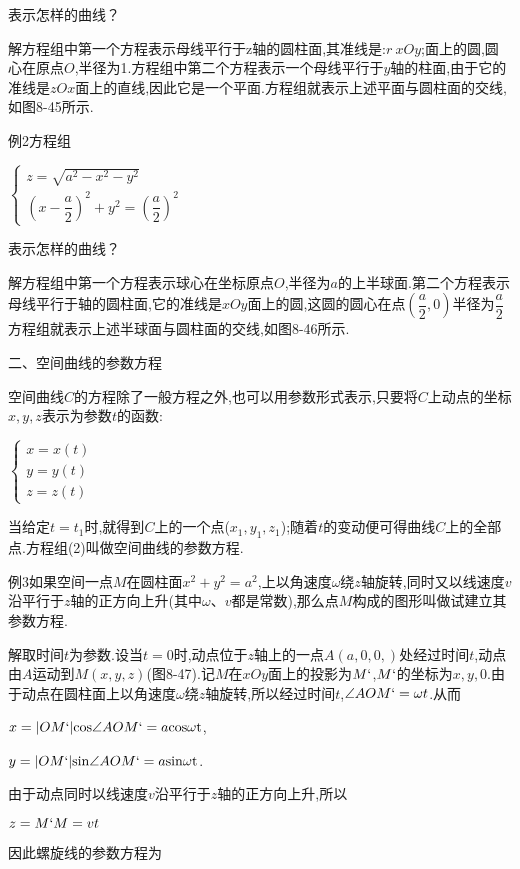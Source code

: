 \documentclass[oneside]{book}
\begin{document}
表示怎样的曲线？

解方程组中第一个方程表示母线平行于z轴的圆柱面,其准线是:$r~xOy$;面上的圆,圆心在原点$O$,半径为1.方程组中第二个方程表示一个母线平行于$y$轴的柱面,由于它的准线是$zOx$面上的直线,因此它是一个平面.方程组就表示上述平面与圆柱面的交线,如图8-45所示.

例2方程组

$\left\{\begin{array}{l}{z=\sqrt{a^{2}-x^{2}-y^{2}}} \\ {\left(x-\dfrac{a}{2}\right)^{2}+y^{2}=\left(\dfrac{a}{2}\right)^{2}}\end{array}\right.$

表示怎样的曲线？

解方程组中第一个方程表示球心在坐标原点$O$,半径为$a$的上半球面.第二个方程表示母线平行于轴的圆柱面,它的准线是$xOy$面上的圆,这圆的圆心在点$\left( {\dfrac{a}{2},0} \right)$半径为$\dfrac{a}{2}$方程组就表示上述半球面与圆柱面的交线,如图8-46所示.

二、空间曲线的参数方程

空间曲线$C$的方程除了一般方程之外,也可以用参数形式表示,只要将$C$上动点的坐标$x,y,z$表示为参数$t$的函数:

$\left\{\begin{array}{l}{x=x(t)} \\ {y=y(t)} \\ {z=z(t)}\end{array}\right.$

当给定$t = {t_1}$时,就得到$C$上的一个点(${x_1},{y_1},{z_1}$);随着$t$的变动便可得曲线$C$上的全部点.方程组(2)叫做空间曲线的参数方程.

例3如果空间一点$M$在圆柱面${x^2} + {y^2} = {a^2}$,上以角速度$\omega $绕$z$轴旋转,同时又以线速度$v$沿平行于$z$轴的正方向上升(其中$\omega $、$v$都是常数),那么点$M$构成的图形叫做试建立其参数方程.

解取时间$t$为参数.设当$t=0$时,动点位于$z$轴上的一点$A(a,0,0,)$处经过时间$t$,动点由$A$运动到$M(x,y,z)$(图8-47).记$M$在$xOy$面上的投影为$M`$,$M`$的坐标为$x,y,0$.由于动点在圆柱面上以角速度$\omega $绕$z$轴旋转,所以经过时间$t$,$\angle AOM` = \omega t$.从而

$x = |OM`|{{\cos}}\angle AOM` = a{{\cos}}\omega {\text{t}}$,

$y = |OM`|{{\sin}}\angle AOM` = a{{\sin}}\omega {\text{t}}$.

由于动点同时以线速度$v$沿平行于$z$轴的正方向上升,所以

$z = M`M = vt$

因此螺旋线的参数方程为
\end{document}
